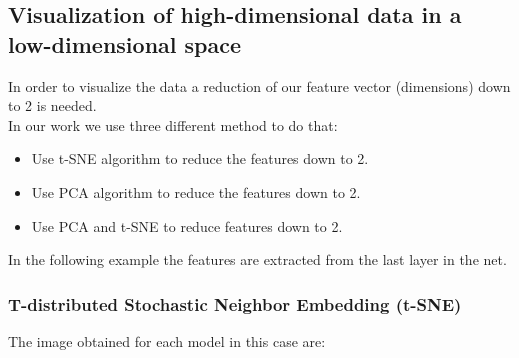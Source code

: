 \documentclass[12pt]{article} %
\begin{document}
\subsection {Visualization of high-dimensional data in a low-dimensional space}
In order to visualize the data a reduction of our feature vector (dimensions) down to 2 is needed.\\
In our work we use three different method to do that:
\begin{itemize}
\item Use t-SNE algorithm to reduce the features down to 2.
\item Use PCA algorithm to reduce the features down to 2.
\item Use PCA and t-SNE to reduce features down to 2.
\end{itemize}
In the following example the features are extracted from the last layer in the net.\\

 \subsubsection {T-distributed Stochastic Neighbor Embedding (t-SNE)}
The image obtained for each model in this case are:\\
\end{document}
